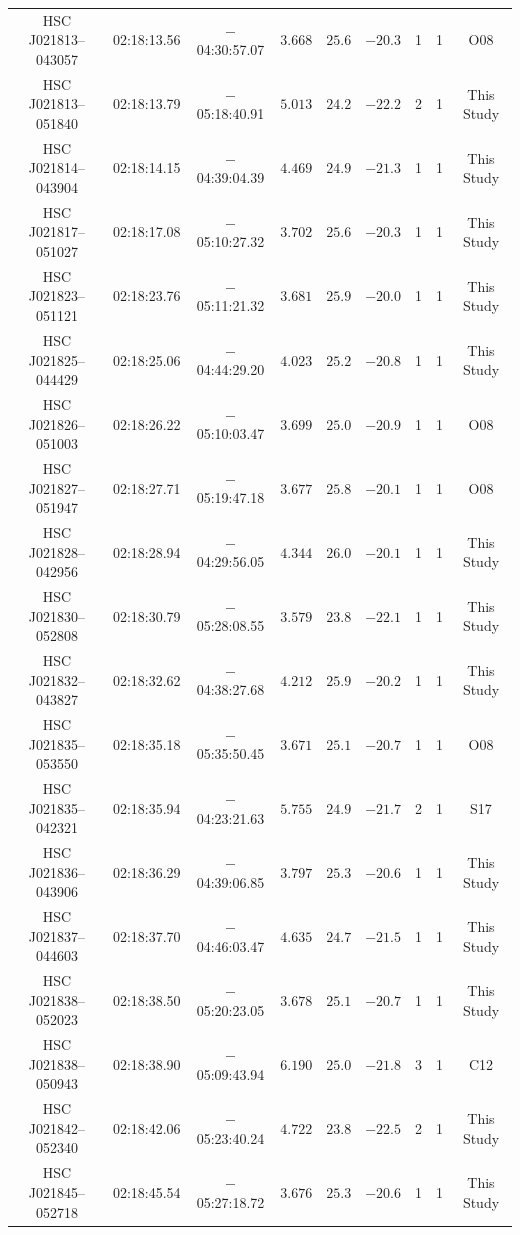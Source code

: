 \documentclass[]{pasj01}
\begin{document}
{\begin{longtable}{ccccccccc}
HSC J021813--043057 & 02:18:13.56 & $-$04:30:57.07 & $3.668$ & $25.6$ & $-20.3$ & 1 & 1 & O08 \\
HSC J021813--051840 & 02:18:13.79 & $-$05:18:40.91 & $5.013$ & $24.2$ & $-22.2$ & 2 & 1 & This Study \\
HSC J021814--043904 & 02:18:14.15 & $-$04:39:04.39 & $4.469$ & $24.9$ & $-21.3$ & 1 & 1 & This Study \\
HSC J021817--051027 & 02:18:17.08 & $-$05:10:27.32 & $3.702$ & $25.6$ & $-20.3$ & 1 & 1 & This Study \\
HSC J021823--051121 & 02:18:23.76 & $-$05:11:21.32 & $3.681$ & $25.9$ & $-20.0$ & 1 & 1 & This Study \\
HSC J021825--044429 & 02:18:25.06 & $-$04:44:29.20 & $4.023$ & $25.2$ & $-20.8$ & 1 & 1 & This Study \\
HSC J021826--051003 & 02:18:26.22 & $-$05:10:03.47 & $3.699$ & $25.0$ & $-20.9$ & 1 & 1 & O08 \\
HSC J021827--051947 & 02:18:27.71 & $-$05:19:47.18 & $3.677$ & $25.8$ & $-20.1$ & 1 & 1 & O08 \\
HSC J021828--042956 & 02:18:28.94 & $-$04:29:56.05 & $4.344$ & $26.0$ & $-20.1$ & 1 & 1 & This Study \\
HSC J021830--052808 & 02:18:30.79 & $-$05:28:08.55 & $3.579$ & $23.8$ & $-22.1$ & 1 & 1 & This Study \\
HSC J021832--043827 & 02:18:32.62 & $-$04:38:27.68 & $4.212$ & $25.9$ & $-20.2$ & 1 & 1 & This Study \\
HSC J021835--053550 & 02:18:35.18 & $-$05:35:50.45 & $3.671$ & $25.1$ & $-20.7$ & 1 & 1 & O08 \\
HSC J021835--042321 & 02:18:35.94 & $-$04:23:21.63 & $5.755$ & $24.9$ & $-21.7$ & 2 & 1 & S17 \\
HSC J021836--043906 & 02:18:36.29 & $-$04:39:06.85 & $3.797$ & $25.3$ & $-20.6$ & 1 & 1 & This Study \\
HSC J021837--044603 & 02:18:37.70 & $-$04:46:03.47 & $4.635$ & $24.7$ & $-21.5$ & 1 & 1 & This Study \\
HSC J021838--052023 & 02:18:38.50 & $-$05:20:23.05 & $3.678$ & $25.1$ & $-20.7$ & 1 & 1 & This Study \\
HSC J021838--050943 & 02:18:38.90 & $-$05:09:43.94 & $6.190$ & $25.0$ & $-21.8$ & 3 & 1 & C12 \\
HSC J021842--052340 & 02:18:42.06 & $-$05:23:40.24 & $4.722$ & $23.8$ & $-22.5$ & 2 & 1 & This Study \\
HSC J021845--052718 & 02:18:45.54 & $-$05:27:18.72 & $3.676$ & $25.3$ & $-20.6$ & 1 & 1 & This Study \\

\end{longtable}}
\end{document}
